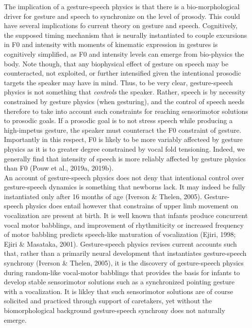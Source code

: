 \documentclass[
  man,floatsintext]{apa6}
\begin{document}
The implication of a gesture-speech physics is that there is a bio-morphological driver for gesture and speech to synchronize on the level of prosody. This could have several implications fo current theory on gesture and speech. Cognitively, the supposed timing mechanism that is neurally instantiated to couple excursions in F0 and intensity with moments of kinematic expression in gestures is cognitively simplified, as F0 and intensity levels can emerge from bio-physics the body. Note though, that any biophysical effect of gesture on speech may be counteracted, not exploited, or further intensified given the intentional prosodic targets the speaker may have in mind. Thus, to be very clear, gesture-speech physics is not something that \emph{controls} the speaker. Rather, speech is by necessity constrained by gesture physics (when gesturing), and the control of speech needs therefore to take into account such constraints for reaching sensorimotor solutions to prosodic goals. If a prosodic goal is to not stress speech while producing a high-impetus gesture, the speaker must counteract the F0 constraint of gesture. Importantly in this respect, F0 is likely to be more variably affecteed by gesture physics as it is to greater degree constrained by vocal fold tensioning. Indeed, we generally find that intensity of speech is more reliably affected by gesture physics than F0 (Pouw et al., 2019a, 2019b).\\
An account of gesture-speech physics does not deny that intentional control over gesture-speech dynamics is something that newborns lack. It may indeed be fully instantiated only after 16 months of age (Iverson \& Thelen, 2005). Gesture-speech physics does entail however that constrains of upper limb movement on vocalization are present at birth. It is well known that infants produce concurrent vocal motor babblings, and improvement of rhythmiticity or increased frequency of motor babbling predicts speech-like maturation of vocalization (Ejiri, 1998; Ejiri \& Masataka, 2001). Gesture-speech physics revises current accounts such that, rather than a primarily neural development that instantiates gesture-speech synchrony (Iverson \& Thelen, 2005), it is the discovery of gesture-speech physics during random-like vocal-motor babblings that provides the basis for infants to develop stable sensorimotor solutions such as a synchronized pointing gesture with a vocalization. It is likley that such sensorimotor solutions are of course solicited and practiced through support of caretakers, yet without the biomorphological background gesture-speech synchrony does not naturally emerge.\\
\end{document}
